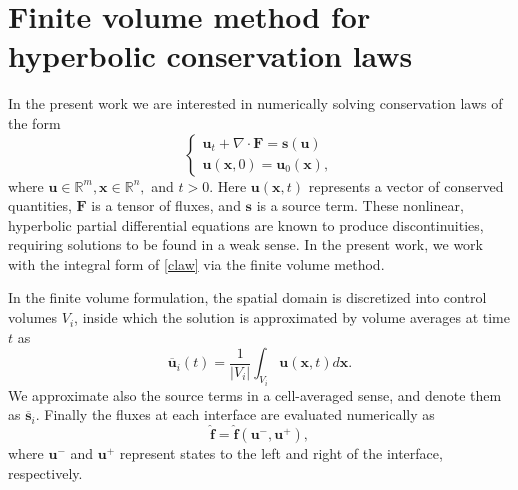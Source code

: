\documentclass[]{article}
\begin{document}
\section{Finite volume method for hyperbolic conservation laws}

    In the present work we are interested in numerically solving conservation
    laws of the form
    \begin{equation}
    \begin{cases}
        \bm{u}_{t} + \nabla \cdot \bm{F} = \bm{s}(\bm{u}) \\
        \bm{u}(\bm{x},0) = \bm{u}_{0}(\bm{x}),
    \end{cases}
    \label{claw}
    \end{equation}
    where $\bm{u} \in \mathbb{R}^{m}, \bm{x} \in \mathbb{R}^{n},$ and $t > 0$.
    Here $\bm{u}(\bm{x},t)$ represents a vector of conserved quantities,
    $\bm{F}$ is a tensor of fluxes, and $\bm{s}$ is a source term. These
    nonlinear, hyperbolic partial differential equations are known to produce
    discontinuities, requiring solutions to be found in a weak sense. In the
    present work, we work with the integral form of \ref{claw} via the finite
    volume method.

    In the finite volume formulation, the spatial domain is discretized into
    control volumes $V_{i}$, inside which the solution is approximated by volume
    averages at time $t$ as
    \begin{equation}
        \overline{\bm{u}}_{i}(t) = \frac{1}{|V_{i}|} \int_{V_{i}} \bm{u}(\bm{x},t) d\bm{x}.
    \end{equation}
    We approximate also the source terms in a cell-averaged sense, and denote
    them as $\overline{\bm{s}}_{i}$. Finally the fluxes at each interface are evaluated numerically as
    \begin{equation}
        \hat{\bm{f}} = \hat{\bm{f}}(\bm{u}^{-},\bm{u}^{+}),
    \end{equation}
    where $\bm{u}^{-}$ and $\bm{u}^{+}$ represent states to the left and right of the interface, respectively.
\end{document}
